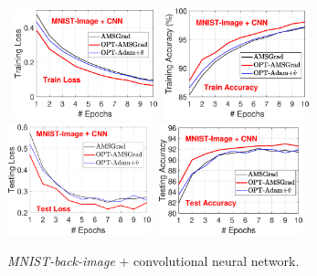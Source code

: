 \documentclass[11pt]{article}
\theoremstyle{k}
\begin{document}

\begin{figure}[h]
\begin{center}
\mbox{
\includegraphics[width=1.65in]{./new_figure/new_mnist_img_figure/mnist_img_train_loss_disz_2.eps}\hspace{-0.1in}
\includegraphics[width=1.65in]{./new_figure/new_mnist_img_figure/mnist_img_train_acc_disz_2.eps}
}
\mbox{
\includegraphics[width=1.65in]{./new_figure/mnist_img_test_loss_disz.eps}\hspace{-0.1in}
\includegraphics[width=1.65in]{./new_figure/mnist_img_test_acc_disz.eps}
}
\end{center}
 \caption{\textit{MNIST-back-image} + convolutional neural network.} \label{figs:M_image_new3}
\end{figure}
\end{document}
